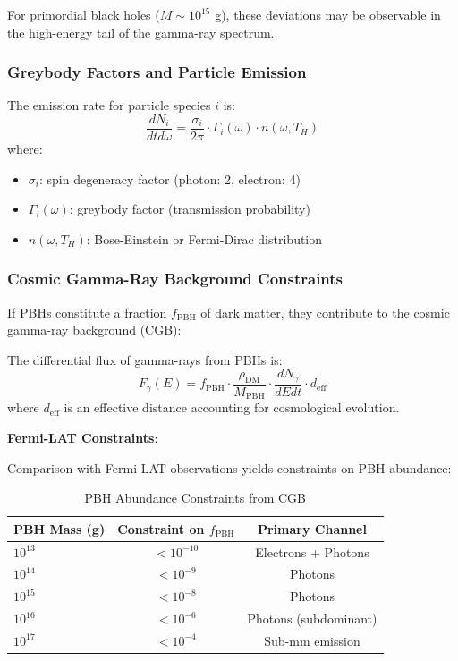 For primordial black holes ($M \sim 10^{15}$ g), these deviations may be observable in the high-energy tail of the gamma-ray spectrum.

\subsubsection{Greybody Factors and Particle Emission}

The emission rate for particle species $i$ is:
\begin{equation}
    \frac{dN_i}{dt d\omega} = \frac{\sigma_{i}}{2\pi} \cdot \Gamma_i(\omega) \cdot n(\omega, T_H)
\end{equation}
where:
\begin{itemize}
    \item $\sigma_i$: spin degeneracy factor (photon: 2, electron: 4)
    \item $\Gamma_i(\omega)$: greybody factor (transmission probability)
    \item $n(\omega, T_H)$: Bose-Einstein or Fermi-Dirac distribution
\end{itemize}

\subsubsection{Cosmic Gamma-Ray Background Constraints}

If PBHs constitute a fraction $f_{\text{PBH}}$ of dark matter, they contribute to the cosmic gamma-ray background (CGB):

\begin{theorem}
The differential flux of gamma-rays from PBHs is:
\begin{equation}
    F_\gamma(E) = f_{\text{PBH}} \cdot \frac{\rho_{\text{DM}}}{M_{\text{PBH}}} \cdot \frac{dN_\gamma}{dE dt} \cdot d_{\text{eff}}
\end{equation}
where $d_{\text{eff}}$ is an effective distance accounting for cosmological evolution.
\end{theorem}

\textbf{Fermi-LAT Constraints}:

Comparison with Fermi-LAT observations yields constraints on PBH abundance:

\begin{table}[h]
\centering
\caption{PBH Abundance Constraints from CGB}
\begin{tabular}{lcc}
\toprule
\textbf{PBH Mass (g)} & \textbf{Constraint on $f_{\text{PBH}}$} & \textbf{Primary Channel} \\
\midrule
$10^{13}$ & $< 10^{-10}$ & Electrons + Photons \\
$10^{14}$ & $< 10^{-9}$ & Photons \\
$10^{15}$ & $< 10^{-8}$ & Photons \\
$10^{16}$ & $< 10^{-6}$ & Photons (subdominant) \\
$10^{17}$ & $< 10^{-4}$ & Sub-mm emission \\
\bottomrule
\end{tabular}
\end{table}

